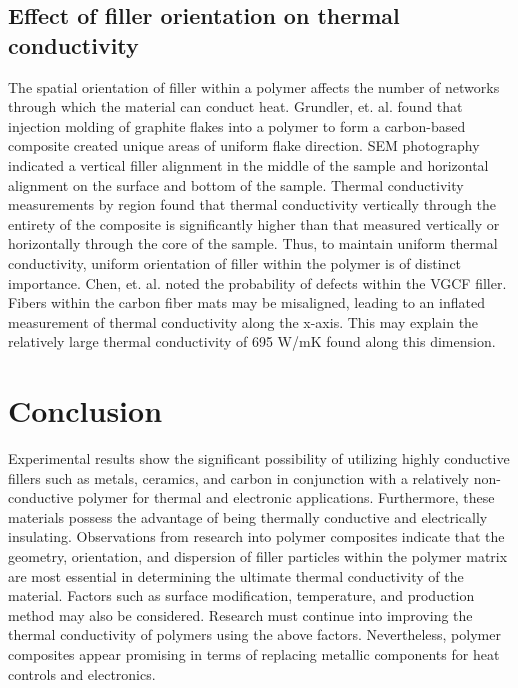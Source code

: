 \documentclass[11pt]{article}
\begin{document}
\begin{multicols}{2}
\subsection{Effect of filler orientation on thermal conductivity}

The spatial orientation of filler within a polymer affects the number of
networks through which the material can conduct heat. Grundler, et. al.
found that injection molding of graphite flakes into a polymer to form a
carbon-based composite created unique areas of uniform flake direction.
SEM photography indicated a vertical filler alignment in the middle of
the sample and horizontal alignment on the surface and bottom of the
sample. Thermal conductivity measurements by region found that thermal
conductivity vertically through the entirety of the composite is
significantly higher than that measured vertically or horizontally
through the core of the sample.\cite{Grundler-2016}  Thus, to maintain uniform
thermal conductivity, uniform orientation of filler within the polymer
is of distinct importance. Chen, et. al. noted the probability of
defects within the VGCF filler. Fibers within the carbon fiber mats may
be misaligned, leading to an inflated measurement of thermal
conductivity along the x-axis. This may explain the relatively large
thermal conductivity of 695 W/mK found along this dimension.\cite{Chen-2002-359}

\section{Conclusion}

Experimental results show the significant possibility of utilizing
highly conductive fillers such as metals, ceramics, and carbon in
conjunction with a relatively non-conductive polymer for thermal and
electronic applications. Furthermore, these materials possess the
advantage of being thermally conductive and electrically insulating.
Observations from research into polymer composites indicate that the
geometry, orientation, and dispersion of filler particles within the
polymer matrix are most essential in determining the ultimate thermal
conductivity of the material. Factors such as surface modification,
temperature, and production method may also be considered. Research must
continue into improving the thermal conductivity of polymers using the
above factors. Nevertheless, polymer composites appear promising in
terms of replacing metallic components for heat controls and
electronics.



\end{multicols}
\end{document}
